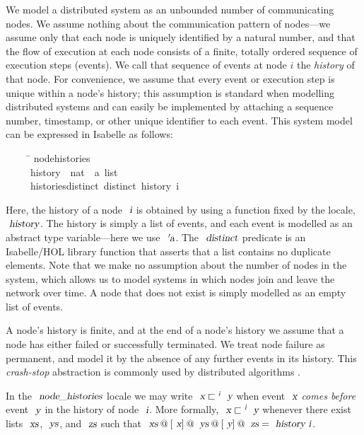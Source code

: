 We model a distributed system as an unbounded number of communicating nodes.
We assume nothing about the communication pattern of nodes---we assume only that each node is uniquely identified by a natural number, and that the flow of execution at each node consists of a finite, totally ordered sequence of execution steps (events).
We call that sequence of events at node $i$ the \emph{history} of that node.
For convenience, we assume that every event or execution step is unique within a node's history; this assumption is standard when modelling distributed systems \cite{Cachin:2011wt} and can easily be implemented by attaching a sequence number, timestamp, or other unique identifier to each event.
This system model can be expressed in Isabelle as follows:
\begin{isabelle}
~~~~\ \=\kill
{} node{\isacharunderscore}histories\ {\isacharequal}\\
~~~~\ \>history\ {\isacharcolon}{\isacharcolon}\ {\isachardoublequoteopen}nat\ {\isasymRightarrow}\ {\isacharprime}a\ list{\isachardoublequoteclose}\ \\
~~~~\ \>histories{\isacharunderscore}distinct{\isacharcolon}\ {\isachardoublequoteopen}distinct\ {\isacharparenleft}history\ i{\isacharparenright}{\isachardoublequoteclose}
\end{isabelle}
Here, the history of a node $\isa{i}$ is obtained by using a function fixed by the locale, $\isa{history}$.
The history is simply a list of events, and each event is modelled as an abstract type variable---here we use $\isa{{\isacharprime}a}$.
The $\isa{distinct}$ predicate is an Isabelle/HOL library function that asserts that a list contains no duplicate elements.
Note that we make no assumption about the number of nodes in the system, which allows us to model systems in which nodes join and leave the network over time.
A node that does not exist is simply modelled as an empty list of events.

A node's history is finite, and at the end of a node's history we assume that a node has either failed or successfully terminated.
We treat node failure as permanent, and model it by the absence of any further events in its history.
This \emph{crash-stop} abstraction is commonly used by distributed algorithms \cite{Cachin:2011wt}.

In the $\isa{node{\isacharunderscore}histories}$ locale we may write $\isa{x} \sqsubset^\isa{i} \isa{y}$ when event $\isa{x}$ \emph{comes before} event $\isa{y}$ in the history of node $\isa{i}$.
More formally, $\isa{x} \sqsubset^\isa{i} \isa{y}$ whenever there exist lists $\isa{xs}$, $\isa{ys}$, and $\isa{zs}$ such that $\isa{xs}\mathbin{@}[\isa{x}]\mathbin{@}\isa{ys}\mathbin{@}[\isa{y}]\mathbin{@}\isa{zs} = \isa{history\ i}$.

